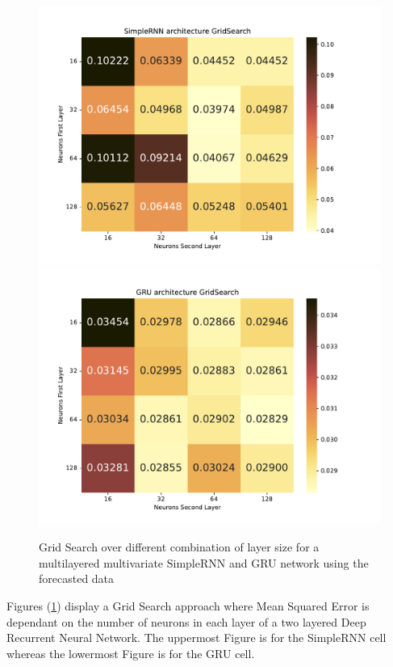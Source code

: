 \documentclass
[twocolumn,
secnumarabic,
nobibnotes,
aps,
prl,
reprint,
groupedaddress,
amsmath,
amssymb,
]{revtex4-2}
\begin{document}
\begin{figure}
  \includegraphics[width=\columnwidth]{figures/Large_forecast_gridsearch_rnn.pdf}
  \includegraphics[width=\columnwidth]{figures/Large_forecast_gridsearch_gru.pdf}
  \caption{\label{fig_largegs}Grid Search over different combination of layer size for a multilayered multivariate SimpleRNN and GRU network using the forecasted data}
\end{figure}

Figures (\ref{fig_largegs}) display a Grid Search approach where Mean Squared Error is dependant on the number of neurons in each layer of a two layered Deep Recurrent Neural Network. The uppermost Figure is for the SimpleRNN cell whereas the lowermost Figure is for the GRU cell. 
\end{document}
